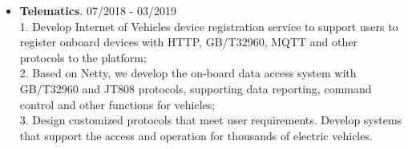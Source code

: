 \documentclass[letterpaper, UTF8]{article}
\begin{document}
\begin{itemize}
		\item \textbf{Telematics}. 07/2018 - 03/2019\\
		1. Develop Internet of Vehicles device registration service to support users to register onboard devices with HTTP, GB/T32960, MQTT and other protocols to the platform; \\
		2. Based on Netty, we develop the on-board data access system with GB/T32960 and JT808 protocols, supporting data reporting, command control and other functions for vehicles; \\
		3. Design customized protocols that meet user requirements. Develop systems that support the access and operation for thousands of electric vehicles.
	\end{itemize}
	\vspace{-0.32in}
	
	\bigskip
\end{document}
